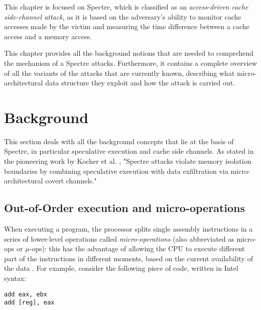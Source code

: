 \documentclass[target=mst,aauheader=aics]{thud}
\theoremstyle{definition}
\begin{document}
	This chapter is focused on Spectre, which is classified as an \textit{access-driven cache side-channel attack}, as it is based on the adversary's ability to monitor cache accesses made by the victim and measuring the time difference between a cache access and a memory access.
	
	This chapter provides all the background notions that are needed to comprehend the mechanism of a Spectre attacks. Furthermore, it contains a complete overview of all the variants of the attacks that are currently known, describing what micro-architectural data structure they exploit and how the attack is carried out.
	\section{Background}
	This section deals with all the background concepts that lie at the basis of Spectre, in particular speculative execution and cache side channels. As stated in the pioneering work by Kocher et al. \cite{Kocher2019}, "Spectre attacks violate memory isolation boundaries by combining speculative execution with data exfiltration via micro-architectural covert channels."
	\subsection{Out-of-Order execution and micro-operations}\label{ooo-exec}
	When executing a program, the processor splits single assembly instructions in a series of lower-level operations called \textit{micro-operations} (also abbreviated as micro-ops or $\mu$-ops): this has the advantage of allowing the CPU to execute different part of the instructions in different moments, based on the current availability of the data \cite{Fog2021}. For example, consider the following piece of code, written in Intel syntax:
	
	\vspace{3mm}
	\begin{minipage}{.3\textwidth}
	\begin{lstlisting}
add eax, ebx
add [reg], eax
	\end{lstlisting}
	\end{minipage}
\end{document}
